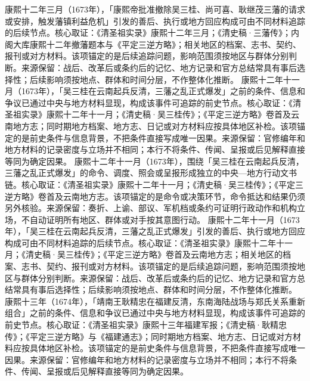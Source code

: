 康熙十二年三月（1673年），「康熙帝批准撤除吴三桂、尚可喜、耿继茂三藩的请求或安排，触发藩镇利益危机」引发的善后、执行或地方回应构成可由不同材料追踪的后续节点。核心取证：《清圣祖实录》康熙十二年三月；《清史稿·三藩传》；内阁大库康熙十二年撤藩题本与《平定三逆方略》；相关地区的档案、志书、契约、报刊或对方材料。该项锚定的是后续追踪问题，影响范围须按地区与群体分别判断。来源保留：战后、改革后或条约后的记忆、地方记录和官方总结常具有事后选择性；后续影响须按地点、群体和时间分层，不作整体化推断。
康熙十二年十一月（1673年），「吴三桂在云南起兵反清，三藩之乱正式爆发」之前的条件、信息和争议已通过中央与地方材料显现，构成该事件可追踪的前史节点。核心取证：《清圣祖实录》康熙十二年十一月；《清史稿·吴三桂传》；《平定三逆方略》卷首及云南地方志；同时期地方档案、地方志、日记或对方材料应按具体地区补检。该项锚定的是前史条件与信息背景，不把条件直接写成唯一因果。来源保留：官修编年和地方材料的记录密度与立场并不相同；本行不将条件、传闻、呈报或后见解释直接等同为确定因果。
康熙十二年十一月（1673年），围绕「吴三桂在云南起兵反清，三藩之乱正式爆发」的命令、调度、照会或呈报形成独立的中央—地方行动文书链。核心取证：《清圣祖实录》康熙十二年十一月；《清史稿·吴三桂传》；《平定三逆方略》卷首及云南地方志。该项锚定的是命令或决策环节，命令抵达和结果仍须另外核验。来源保留：奏折、上谕、部议、军机档或条约可证明行政动作和机构立场，不自动证明所有地区、群体或对手按其意图行动。
康熙十二年十一月（1673年），「吴三桂在云南起兵反清，三藩之乱正式爆发」引发的善后、执行或地方回应构成可由不同材料追踪的后续节点。核心取证：《清圣祖实录》康熙十二年十一月；《清史稿·吴三桂传》；《平定三逆方略》卷首及云南地方志；相关地区的档案、志书、契约、报刊或对方材料。该项锚定的是后续追踪问题，影响范围须按地区与群体分别判断。来源保留：战后、改革后或条约后的记忆、地方记录和官方总结常具有事后选择性；后续影响须按地点、群体和时间分层，不作整体化推断。
康熙十三年（1674年），「靖南王耿精忠在福建反清，东南海陆战场与郑氏关系重新组合」之前的条件、信息和争议已通过中央与地方材料显现，构成该事件可追踪的前史节点。核心取证：《清圣祖实录》康熙十三年福建军报；《清史稿·耿精忠传》；《平定三逆方略》与《福建通志》；同时期地方档案、地方志、日记或对方材料应按具体地区补检。该项锚定的是前史条件与信息背景，不把条件直接写成唯一因果。来源保留：官修编年和地方材料的记录密度与立场并不相同；本行不将条件、传闻、呈报或后见解释直接等同为确定因果。
